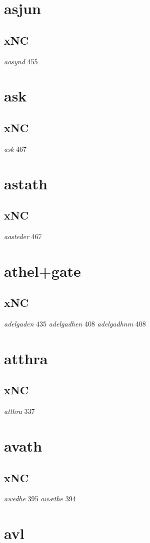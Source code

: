 \documentclass[a4paper,twocolumn]{article}
\begin{document}
\section{asjun}
\label{sec:orge2ce1b7}
\subsection{xNC}
\label{sec:org270fa08}
\emph{aasynd} 455 
\section{ask}
\label{sec:orgd244b88}
\subsection{xNC}
\label{sec:org9afc1c4}
\emph{ask} 467 
\section{astath}
\label{sec:org1388649}
\subsection{xNC}
\label{sec:orgdc2eeb1}
\emph{aasteder} 467 
\section{athel+gate}
\label{sec:org7f6b307}
\subsection{xNC}
\label{sec:org0055e61}
\emph{adelgaden} 435 \emph{adelgadhen} 408 \emph{adelgadhnm} 408 
\section{atthra}
\label{sec:orga3a0453}
\subsection{xNC}
\label{sec:org8ed4e58}
\emph{atthra} 337 
\section{avath}
\label{sec:org627912b}
\subsection{xNC}
\label{sec:org9fb4985}
\emph{awedhe} 395 \emph{awæthe} 394 
\section{avl}
\label{sec:org45aca11}
\end{document}
